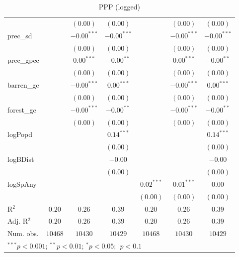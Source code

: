 \begin{sidewaystable}
\begin{center}
{\begin{tabular}{l c c c c c c}
                &               & $(0.00)$      & $(0.00)$      &               & $(0.00)$      & $(0.00)$      \\
prec\_sd        &               & $-0.00^{***}$ & $-0.00^{***}$ &               & $-0.00^{***}$ & $-0.00^{***}$ \\
                &               & $(0.00)$      & $(0.00)$      &               & $(0.00)$      & $(0.00)$      \\
prec\_gpcc      &               & $0.00^{***}$  & $-0.00^{**}$  &               & $0.00^{***}$  & $-0.00^{**}$  \\
                &               & $(0.00)$      & $(0.00)$      &               & $(0.00)$      & $(0.00)$      \\
barren\_gc      &               & $-0.00^{***}$ & $0.00^{***}$  &               & $-0.00^{***}$ & $0.00^{***}$  \\
                &               & $(0.00)$      & $(0.00)$      &               & $(0.00)$      & $(0.00)$      \\
forest\_gc      &               & $-0.00^{***}$ & $-0.00^{**}$  &               & $-0.00^{***}$ & $-0.00^{**}$  \\
                &               & $(0.00)$      & $(0.00)$      &               & $(0.00)$      & $(0.00)$      \\
logPopd         &               &               & $0.14^{***}$  &               &               & $0.14^{***}$  \\
                &               &               & $(0.00)$      &               &               & $(0.00)$      \\
logBDist        &               &               & $-0.00$       &               &               & $-0.00$       \\
                &               &               & $(0.00)$      &               &               & $(0.00)$      \\
logSpAny        &               &               &               & $0.02^{***}$  & $0.01^{***}$  & $0.00$        \\
                &               &               &               & $(0.00)$      & $(0.00)$      & $(0.00)$      \\
\hline
R$^2$           & $0.20$        & $0.26$        & $0.39$        & $0.20$        & $0.26$        & $0.39$        \\
Adj. R$^2$      & $0.20$        & $0.26$        & $0.39$        & $0.20$        & $0.26$        & $0.39$        \\
Num. obs.       & $10468$       & $10430$       & $10429$       & $10468$       & $10430$       & $10429$       \\
\hline
\multicolumn{7}{l}{\scriptsize{$^{***}p<0.001$; $^{**}p<0.01$; $^{*}p<0.05$; $^{\cdot}p<0.1$}}
\end{tabular}
}
\caption{PPP
	      (logged)}
\label{logPpp}
\end{center}
\end{sidewaystable}

